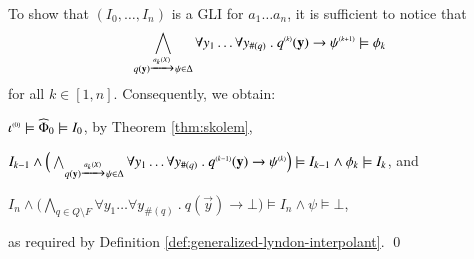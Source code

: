 To show that $(I_0,\ldots,I_n)$ is a GLI for $a_1\ldots a_n$, it is
sufficient to notice that \[\bigwedge_{q(\mathbf y) \xrightarrow{{\scriptscriptstyle a_k(X)}}_{{\scriptstyle }}
  \psi \in \Delta} \forall y_1 \ldots \forall y_{\#(q)} ~.~
{q}^{\scriptscriptstyle{({k})}}(\mathbf y) \rightarrow {\psi}^{\scriptscriptstyle{({k+1})}} \models \phi_k\]
for all $k \in [1,n]$. Consequently, we obtain: \begin{compactitem}
\item ${\iota}^{\scriptscriptstyle{({0})}} \models \widehat{\Phi}_0 \models I_0$, by
  Theorem \ref{thm:skolem},
\item $I_{k-1} \wedge \Big(\bigwedge_{q(\mathbf y) \xrightarrow{{\scriptscriptstyle a_k(X)}}_{{\scriptstyle }}
  \psi \in \Delta} \forall y_1 \ldots \forall y_{\#(q)} ~.~
  {q}^{\scriptscriptstyle{({k-1})}}(\mathbf y) \rightarrow {\psi}^{\scriptscriptstyle{({k})}}\Big) \models
  I_{k-1} \wedge \phi_k \models I_k$, and 
\item $I_n \wedge \Big(\bigwedge_{q \in Q \setminus F} \forall y_1
  \ldots \forall y_{\#(q)} ~.~ q(\vec{y}) \rightarrow \bot\Big)
  \models I_n \wedge \psi \models \bot$,     
\end{compactitem}
as required by Definition
\ref{def:generalized-lyndon-interpolant}. \qed
